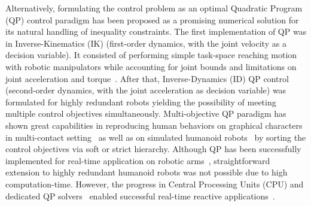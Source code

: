 Alternatively, formulating the control problem as an optimal Quadratic Program (QP) control paradigm has been proposed as a promising numerical solution for its natural handling of inequality constraints. The first implementation of QP was in Inverse-Kinematics (IK) (first-order dynamics, with the joint velocity as a decision variable). It consisted of performing simple task-space reaching motion with robotic manipulators while accounting for joint bounds and limitations on joint acceleration and torque~\cite{faverjon1987icra,cheng1994tra,park1998icra,zhang2004transactionsonSysManCyb2}. After that, Inverse-Dynamics (ID) QP  control (second-order dynamics, with the joint acceleration as decision variable) was formulated for highly redundant robots yielding the possibility of meeting multiple control objectives simultaneously. Multi-objective QP paradigm has shown great capabilities in reproducing human behaviors on graphical characters in multi-contact setting~\cite{abe2007siggraph,collette2007humanoids} as well as on simulated humanoid robots~\cite{bouyarmane2011iros,bouyarmane2012humanoids_b,saab2011icra,kanoun2011tro,salini2010springer} by sorting the control objectives via soft or strict hierarchy. Although QP has been successfully implemented for real-time application on robotic arms~\cite{decre2009icra,rubrecht2010iros,rubrecht2012autonRobot}, straightforward extension to highly redundant humanoid robots was not possible due to high computation-time. However, the progress in Central Processing Units (CPU) and dedicated QP solvers~\cite{escande2010icra,escande2014ijrr} enabled successful real-time reactive applications~\cite{herzog2014iros,herzog2016autonomousRobot,vaillant2014humanoids,vaillant2016springer,galloway2015ieeeAccess,ames2014tac}.  


